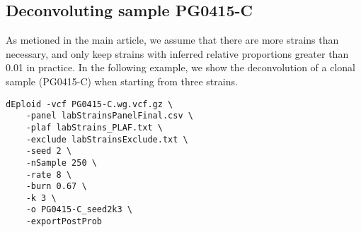 \subsection{Deconvoluting sample {\textmd PG0415-C}}
As metioned in the main article, we assume that there are more strains than necessary, and only keep strains with inferred relative proportions greater than 0.01 in practice. In the following example, we show the deconvolution of a clonal sample ({\textmd PG0415-C}) when starting from three strains.
\linespread{1}
\begin{lstlisting}
dEploid -vcf PG0415-C.wg.vcf.gz \
    -panel labStrainsPanelFinal.csv \
    -plaf labStrains_PLAF.txt \
    -exclude labStrainsExclude.txt \
    -seed 2 \
    -nSample 250 \
    -rate 8 \
    -burn 0.67 \
    -k 3 \
    -o PG0415-C_seed2k3 \
    -exportPostProb
\end{lstlisting}


